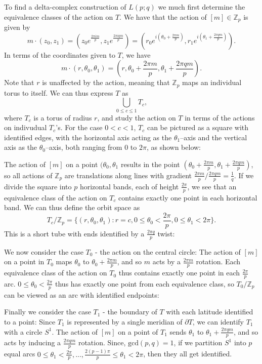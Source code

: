 \documentclass{article}
\begin{document}
To find a delta-complex construction of $L(p;q)$ we much first determine the equivalence classes of the action on $T$. We have that the action of $[m]\in\mathbb{Z}_p$ is given by \[m\cdot(z_0,z_1)=(z_0e^{\frac{2\pi im}{p}},z_1e^{\frac{2\pi iqm}{p}})=(r_0e^{i(\theta_0+\frac{2\pi m}{p})},r_1e^{i(\theta_1+\frac{2\pi qm}{p})}).\] In terms of the coordinates given to $T$, we have\[m\cdot(r,\theta_0,\theta_1)=(r,\theta_0+\frac{2\pi m}{p},\theta_1+\frac{2\pi qm}{p}).\] Note that $r$ is unaffected by the action, meaning that $\mathbb{Z}_p$ maps an individual torus to itself. We can thus express $T$ as\[\bigcup_{0\leq c\leq 1}T_c,\] where $T_c$ is a torus of radius $r$, and study the action on $T$ in terms of the actions on indivudual $T_c$'s.
For the case $0<c<1$, $T_c$ can be pictured as a square with identified edges, with the horizontal axis acting as the $\theta_1$--axis and the vertical axis as the $\theta_0$--axis, both ranging from $0$ to $2\pi$, as shown below:

The action of $[m]$ on a point $(\theta_0,\theta_1$ results in the point $(\theta_0+\frac{2\pi m}{p},\theta_1+\frac{2\pi qm}{p})$, so all actions of $\mathbb{Z}_p$ are translations along lines with gradient $\frac{2\pi m}{p}/\frac{2\pi qm}{p}=\frac{1}{q}$. If we divide the square into $p$ horizontal bands, each of height $\frac{2\pi}{p}$, we see that an equivalence class of the action on $T_c$ contains exactly one point in each horizontal band. We can thus define the orbit space as \[T_c/\mathbb{Z}_p=\{(r,\theta_0,\theta_1):r=c,0\leq\theta_0<\frac{2\pi}{p},0\leq\theta_1<2\pi\}.\] This is a short tube with ends identified by a $\frac{2\pi q}{p}$ twist:

We now consider the case $T_0$ - the action on the central circle:
The action of $[m]$ on a point in $T_0$ maps $\theta_0$ to $\theta_0+\frac{2\pi m}{p}$, and so $m$ acts by a $\frac{2\pi m}{p}$ rotation. Each equivalence class of the action on $T_0$ thus contains exactly one point in each $\frac{2\pi}{p}$ arc. $0\leq\theta_0<\frac{2\pi}{p}$ thus has exactly one point from each equivalence class, so $T_0/\mathbb{Z}_p$ can be viewed as an arc with identified endpoints:

Finally we consider the case $T_1$ - the boundary of $T$ with each latitude identified to a point:
Since $T_1$ is represented by a single meridian of $\partial T$, we can identify $T_1$ with a circle $S^1$. The action of $[m]$ on a point of $T_1$ sends $\theta_1$ to $\theta_1+\frac{2\pi qm}{p}$, and so acts by inducing a $\frac{2\pi qm}{p}$ rotation. Since, $\text{gcd}(p,q)=1$, if we partition $S^1$ into $p$ equal arcs $0\leq\theta_1<\frac{2\pi}{p},...,\frac{2(p-1)\pi}{p}\leq\theta_1<2\pi$, then they all get identified.
\end{document}

